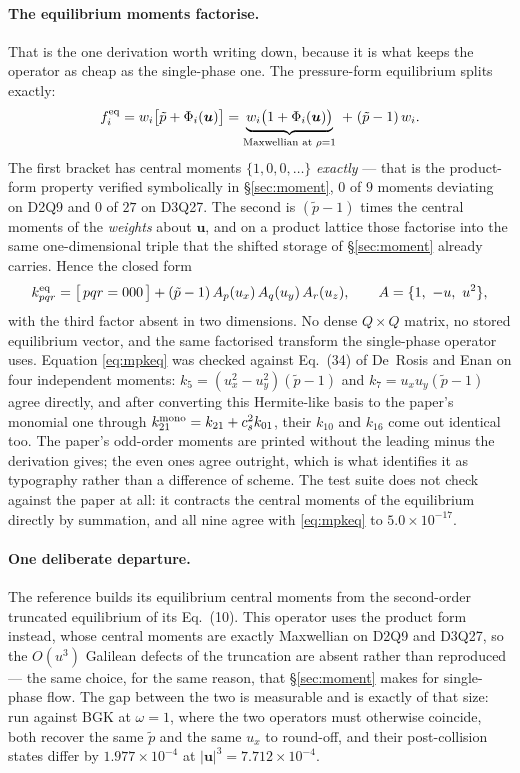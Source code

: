 \documentclass[11pt,a4paper]{article}
\newcommand{\cs}{c_s}
\newcommand{\uu}{\bm{u}}
\newcommand{\e}[1]{\times 10^{#1}}
\begin{document}
\paragraph{The equilibrium moments factorise.} That is the one derivation worth
writing down, because it is what keeps the operator as cheap as the single-phase
one. The pressure-form equilibrium splits exactly:
\[
  f_i^{\rm eq} = w_i\big[\tilde p + \Phi_i(\uu)\big]
    = \underbrace{w_i\big(1+\Phi_i(\uu)\big)}_{\text{Maxwellian at }\rho=1}
      \;+\;(\tilde p-1)\,w_i .
\]
The first bracket has central moments $\{1,0,0,\ldots\}$ \emph{exactly} --- that is
the product-form property verified symbolically in \S\ref{sec:moment}, $0$ of $9$
moments deviating on D2Q9 and $0$ of $27$ on D3Q27. The second is $(\tilde p-1)$
times the central moments of the \emph{weights} about $\uu$, and on a product
lattice those factorise into the same one-dimensional triple that the shifted
storage of \S\ref{sec:moment} already carries. Hence the closed form
\begin{equation}
  k^{\rm eq}_{pqr} = \big[\,pqr = 000\,\big]
    + (\tilde p - 1)\,A_p(u_x)\,A_q(u_y)\,A_r(u_z),
  \qquad A = \{1,\ -u,\ u^2\},
  \label{eq:mpkeq}
\end{equation}
with the third factor absent in two dimensions. No dense $Q\times Q$ matrix, no
stored equilibrium vector, and the same factorised transform the single-phase
operator uses. Equation \eqref{eq:mpkeq} was checked against Eq.~(34) of
De~Rosis and Enan on four independent moments: $k_5=(u_x^2-u_y^2)(\tilde p-1)$ and
$k_7=u_xu_y(\tilde p-1)$ agree directly, and after converting this
Hermite-like basis to the paper's monomial one through
$k^{\rm mono}_{21}=k_{21}+\cs^2k_{01}$, their $k_{10}$ and $k_{16}$ come out
identical too. The paper's odd-order moments are printed without the leading minus
the derivation gives; the even ones agree outright, which is what identifies it as
typography rather than a difference of scheme. The test suite does not check
against the paper at all: it contracts the central moments of the equilibrium
directly by summation, and all nine agree with \eqref{eq:mpkeq} to
$5.0\e{-17}$.

\paragraph{One deliberate departure.} The reference builds its equilibrium central
moments from the second-order truncated equilibrium of its Eq.~(10). This operator
uses the product form instead, whose central moments are exactly Maxwellian on
D2Q9 and D3Q27, so the $O(u^3)$ Galilean defects of the truncation are absent
rather than reproduced --- the same choice, for the same reason, that
\S\ref{sec:moment} makes for single-phase flow. The gap between the two is
measurable and is exactly of that size: run against BGK at $\omega=1$, where the
two operators must otherwise coincide, both recover the same $\tilde p$ and the
same $u_x$ to round-off, and their post-collision states differ by
$1.977\e{-4}$ at $|\uu|^3=7.712\e{-4}$.
\end{document}
